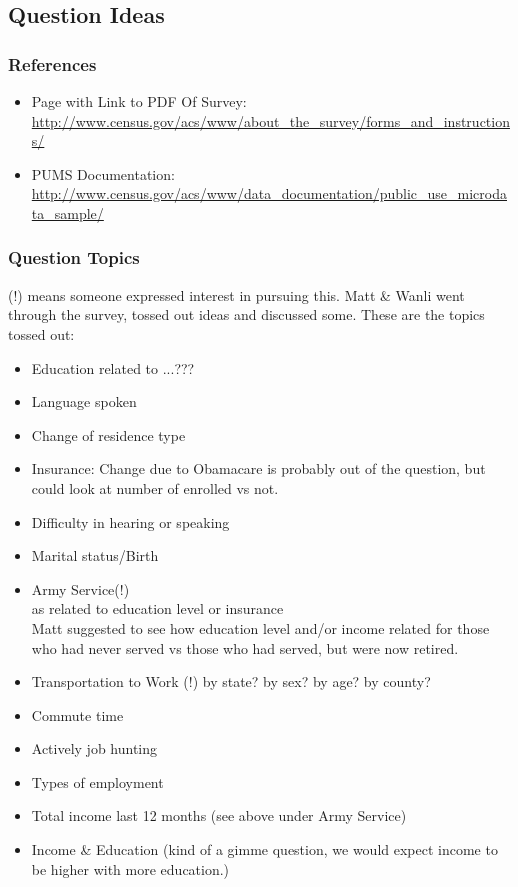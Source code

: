 \documentclass{article}
\begin{document}
\subsection{Question Ideas}
\subsubsection{References}
\begin{itemize}
\item Page with Link to PDF Of Survey: \url{http://www.census.gov/acs/www/about_the_survey/forms_and_instructions/}
\item PUMS Documentation: \url{http://www.census.gov/acs/www/data_documentation/public_use_microdata_sample/}
\end{itemize}

\subsubsection{Question Topics}
(!) means someone expressed interest in pursuing this. Matt \& Wanli went through the survey, tossed out ideas and discussed some. These are the topics tossed out:

\begin{itemize}
\item Education related to ...???
\item Language spoken
\item Change of residence type
\item Insurance: Change due to Obamacare is probably out of the question, but could look at number of enrolled vs not.
\item Difficulty in hearing or speaking
\item Marital status/Birth
\item Army Service(!)\\
  as related to education level or insurance\\
  Matt suggested to see how education level and/or income related for those who had never served vs those who had served, but were now retired.
\item Transportation to Work (!)
  by state? by sex? by age? by county? 
\item Commute time
\item Actively job hunting
\item Types of employment
\item Total income last 12 months (see above under Army Service)
\item Income \& Education (kind of a gimme question, we would expect income to be higher with more education.)
\end{itemize}
\end{document}
